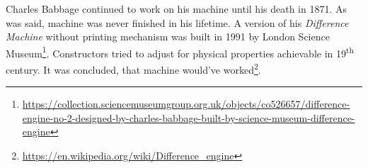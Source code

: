 \documentclass{article}
\begin{document}
            Charles Babbage continued to work on his machine until his death in 1871. As was said, machine was never finished in his lifetime.
            A version of his \emph{Difference Machine} without printing mechanism was built in 1991 by
            London Science Museum\footnote{\href{https://collection.sciencemuseumgroup.org.uk/objects/co526657/difference-engine-no-2-designed-by-charles-babbage-built-by-science-museum-difference-engine}
            {https://collection.sciencemuseumgroup.org.uk/objects/co526657/difference-engine-no-2-designed-by-charles-babbage-built-by-science-museum-difference-engine}}. 
            Constructors tried to adjust for physical properties achievable in 19\textsuperscript{th} century. It was concluded, that machine would've worked\footnote{\href{https://en.wikipedia.org/wiki/Difference_engine}
            {https://en.wikipedia.org/wiki/Difference\_engine}}.



\end{document}
